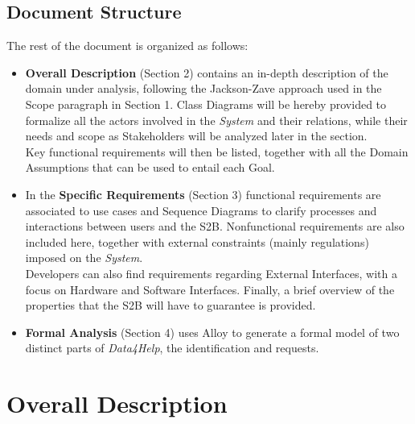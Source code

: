 \documentclass[titlepage]{article}
\begin{document}
	\subsection{Document Structure}
			The rest of the document is organized as follows:
				\begin{itemize}
					\item {\bf Overall Description} (Section 2) contains an in-depth description of the domain under analysis, following the Jackson-Zave approach used in the Scope paragraph in Section 1. Class Diagrams will be hereby provided to formalize all the actors involved in the {\it System} and their relations, while their needs and scope as Stakeholders will be analyzed later in the section.\\
Key functional requirements will then be listed, together with all the Domain Assumptions that can be used to entail each Goal.
					\item In the {\bf Specific Requirements} (Section 3) functional requirements are associated to use cases and Sequence Diagrams to clarify processes and interactions between users and the S2B. Nonfunctional requirements are also included here, together with external constraints (mainly regulations) imposed on the {\it System}.\\
Developers can also find requirements regarding External Interfaces, with a focus on Hardware and Software Interfaces. Finally, a brief overview of the properties that the S2B will have to guarantee is provided.
					\item {\bf Formal Analysis} (Section 4) uses Alloy to generate a formal model of two distinct parts of {\it Data4Help}, the identification and requests.
				\end{itemize}

\pagebreak	
	
\section{Overall Description}
\end{document}
